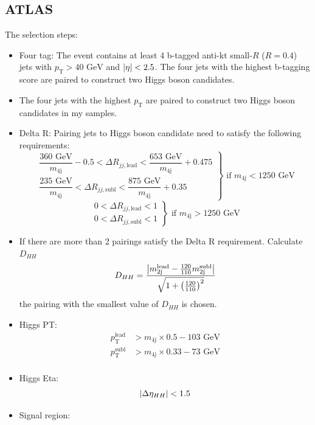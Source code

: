 \documentclass[12pt]{article}
\begin{document}
	\subsection{ATLAS}%
	\label{sub:atlas}
		The selection steps:
		\begin{itemize}
			\item Four tag: The event contains at least 4 b-tagged anti-kt small-$R$ ($R = 0.4$) jets with $p_\text{T} > \text{40 GeV}$ and $\abs{\eta} < 2.5$. The four jets with the highest b-tagging score are paired to construct two Higgs boson candidates.
			\item The four jets with the highest $p_\text{T}$ are paired to construct two Higgs boson candidates in my samples.
			\item Delta R: Pairing jets to Higgs boson candidate need to satisfy the following requirements:
			\[
				\left.
				\begin{array}{c}
					\dfrac{\text{360 GeV}}{m_\text{4j}} - 0.5 < \Delta R_{jj,\text{lead}} < \dfrac{\text{653 GeV}}{m_{\text{4j}}} + 0.475 \\
					\dfrac{\text{235 GeV}}{m_\text{4j}}  < \Delta R_{jj,\text{subl}} < \dfrac{\text{875 GeV}}{m_{\text{4j}}} + 0.35 
				\end{array} 
				\right\} \text{ if } m_{\text{4j}} <  \text{1250 GeV}
			\] 
			\[
				\left.
				\begin{array}{c}
					0 < \Delta R_{jj,\text{lead}} < 1 \\
					0 < \Delta R_{jj,\text{subl}} < 1 
				\end{array} 
				\right\} \text{ if } m_{\text{4j}} >  \text{1250 GeV}
			\] 
			\item If there are more than 2 pairings satisfy the Delta R requirement. Calculate $D_{HH}$
			\[
				D_{HH} = \frac{\abs{m_{\text{2j}}^{\text{lead}} - \frac{120}{110} m_{\text{2j}}^{\text{subl}}}}{\sqrt{1 + \left( \frac{120}{110} \right)^2}}
			\] 
			the pairing with the smallest value of $D_{HH}$ is chosen.
			\item Higgs PT: 
			\begin{align*}
				p_{\text{T}}^{\text{lead}} &> m_{\text{4j}} \times 0.5 - \text{103 GeV} \\
				p_{\text{T}}^{\text{subl}} &> m_{\text{4j}} \times 0.33 - \text{73 GeV} \\
			\end{align*}
			\item Higgs Eta: 
			\[
				\abs{\Delta\eta_{HH}} < 1.5
			\] 
			\item Signal region:

\end{itemize}
\end{document}
